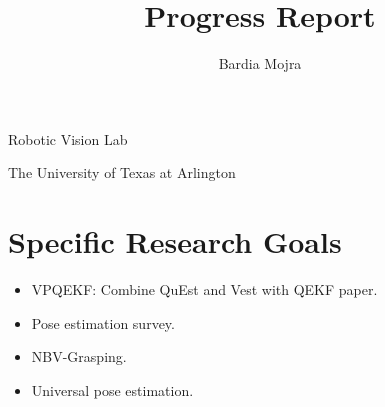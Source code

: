 \documentclass[11pt]{article}
\title{Progress Report}
\author{Bardia Mojra}
\begin{document}
\maketitle
\thispagestyle{empty}

\bigskip
\bigskip
\begin{center}
      Robotic Vision Lab
\end{center}

\begin{center}
      The University of Texas at Arlington
\end{center}

\newpage

\section{Specific Research Goals}
\begin{itemize}
      \item VPQEKF: Combine QuEst and Vest with QEKF paper.
      \item Pose estimation survey.
      \item NBV-Grasping.
      \item Universal pose estimation.
\end{itemize}
\end{document}
